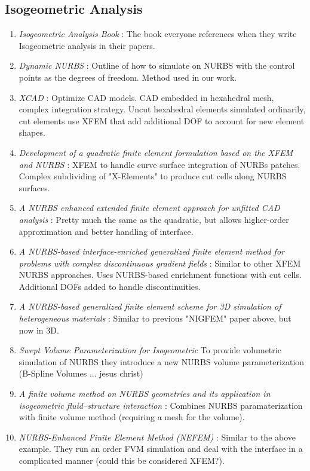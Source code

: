 \subsection{Isogeometric Analysis}
\begin{enumerate}
    \item \textit{Isogeometric Analysis Book} \cite{10.1002/9780470749081.ch7}: The book everyone references when they write Isogeometric analysis in their papers.
    \item \textit{Dynamic NURBS} \cite{10.1145/176579.176580}: Outline of how to simulate on NURBS with the control points as the degrees of freedom. Method used in our work.
    \item \textit{XCAD} \cite{10.1145/3355089.3356576}: Optimize CAD models. CAD embedded in hexahedral mesh, complex integration strategy. Uncut hexahedral elements simulated ordinarily, cut elements use XFEM that add additional DOF to account for new element shapes.
    \item \textit{Development of a quadratic finite element formulation based on the XFEM and NURBS} \cite{https://doi.org/10.1002/nme.3120}: XFEM to handle curve surface integration of NURBs patches. Complex subdividing of "X-Elements" to produce cut cells along NURBS surfaces.
    \item \textit{A NURBS enhanced extended finite element approach for unfitted CAD analysis} \cite{10.1007/s00466-013-0854-7}: Pretty much the same as the quadratic, but allows higher-order approximation and better handling of interface.
    \item \textit{A NURBS-based interface-enriched generalized finite element method for problems with complex discontinuous gradient fields} \cite{https://doi.org/10.1002/nme.4852}: Similar to other XFEM NURBS approaches. Uses NURBS-based enrichment functions with cut cells. Additional DOFs added to handle discontinuities.
    \item \textit{A NURBS-based generalized finite element scheme for 3D simulation of heterogeneous materials} \cite{SAFDARI2016373}: Similar to previous "NIGFEM" paper above, but now in 3D.
    \item \textit{Swept Volume Parameterization for Isogeometric} \cite{10.1007/978-3-642-03596-8_2} To provide volumetric simulation of NURBS they introduce a new NURBS volume parameterization (B-Spline Volumes ... jesus christ)
    \item \textit{A finite volume method on NURBS geometries and its application in isogeometric fluid–structure interaction} \cite{HEINRICH20121645}: Combines NURBS paramaterization with finite volume method (requiring a mesh for the volume). 
    \item \textit{NURBS-Enhanced Finite Element Method (NEFEM)} \cite{10.1002/nme.2311}: Similar to the above example. They run an order FVM simulation and deal with the interface in a complicated manner (could this be considered XFEM?).
\end{enumerate}

